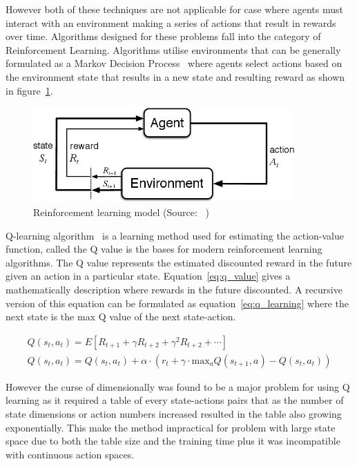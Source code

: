 However both of these techniques are not applicable for case where agents must interact with an environment making a
series of actions that result in rewards over time. Algorithms designed for these problems fall into the category of
Reinforcement Learning. Algorithms utilise environments that can be generally formulated as a Markov Decision
Process~\citep{Bel} where agents select actions based on the environment state that results in a new state and resulting
reward as shown in figure~\ref{fig:reinforcement_learning}.

\begin{figure}[h]
    \centering
    \includegraphics[width=10cm]{figures/reinforcement_learning.png}
    \caption{Reinforcement learning model (Source: ~\cite{Sutton1998})}
    \label{fig:reinforcement_learning}
\end{figure}

Q-learning algorithm~\cite{watkins1992q-learning} is a learning method used for estimating the action-value function,
called the Q value is the bases for modern reinforcement learning algorithms. The Q value represents the estimated
discounted reward in the future given an action in a particular state. Equation~\eqref{eq:q_value} gives a
mathematically description where rewards in the future discounted. A recursive version of this equation can be
formulated as equation~\eqref{eq:q_learning} where the next state is the max Q value of the next state-action.

\begin{align}
    Q(s_t, a_t) = E[R_{t+1} + \gamma R_{t+2} + \gamma^2 R_{t+2} + \cdots ] \label{eq:q_value} \\
    Q(s_t, a_t) = Q(s_t, a_t) + \alpha \cdot (r_t + \gamma \cdot \text{max}_a Q(s_{t+1} , a) - Q(s_t, a_t) ) \label{eq:q_learning}
\end{align}

However the curse of dimensionally was found to be a major problem for using Q learning as it required a table of
every state-actions pairs that as the number of state dimensions or action numbers increased resulted in the table
also growing exponentially. This make the method impractical for problem with large state space due to both the table
size and the training time plus it was incompatible with continuous action spaces.

